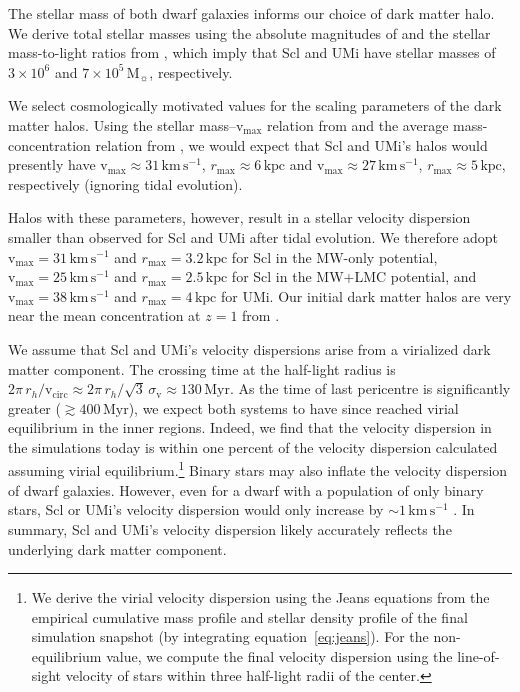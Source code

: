\documentclass[linenumbers, twocolumn, twocolappendix]{aastex701}
\newcommand{\V}{\textrm{v}}
\newcommand{\vmax}{\V_\text{max}}
\newcommand{\rmax}{r_\text{max}}
\newcommand{\kpc}{\text{kpc}}
\newcommand{\kms}{\mathrm{km\,s^{-1}}}
\newcommand{\Mo}{\mathrm{M}_\sun}
\begin{document}
The stellar mass of both dwarf galaxies informs our choice of dark matter halo. We derive total stellar masses using the absolute magnitudes of \citet{munoz+2018} and the stellar mass-to-light ratios from \citet{woo+courteau+dekel2008}, which imply that Scl and UMi have stellar masses of $3\times10^6$ and $7\times10^5\,\Mo$, respectively.

We select cosmologically motivated values for the scaling parameters of the dark matter halos. 
Using the stellar mass--$\vmax$ relation from \citet{fattahi+2018} and the average mass-concentration relation from \citet{ludlow+2016}, we would expect that Scl and UMi's halos would presently have $\vmax \approx 31 \,\kms$, $\rmax\approx6\,\kpc$ and $\vmax \approx 27\,\kms$, $\rmax\approx5\,\kpc$, respectively (ignoring tidal evolution). 

Halos with these parameters, however, result in a stellar velocity dispersion smaller than observed for Scl and UMi after tidal evolution. We therefore adopt  $\vmax = 31\,\kms$ and $\rmax=3.2\,\kpc$ for Scl in the MW-only potential, $\vmax=25\,\kms$ and $\rmax=2.5\,\kpc$ for Scl in the MW+LMC potential, and
$\vmax=38\,\kms$ and $\rmax=4\,\kpc$ for UMi. 
Our initial dark matter halos are very near the mean concentration at $z=1$ from \citet{ludlow+2016}.

We assume that Scl and UMi's velocity dispersions arise from a virialized dark matter component. The crossing time at the half-light radius is $2\pi\, r_h / \mathrm{v}_\textrm{circ} \approx 2\pi\, r_h / \sqrt{3}\,\sigma_\V \approx 130\,\text{Myr}$. As the time of last pericentre is significantly greater ($\gtrsim400\,\text{Myr}$), we expect both systems to have since reached virial equilibrium in the inner regions.
Indeed, we find that the velocity dispersion in the simulations today is within one percent of the velocity dispersion calculated assuming virial equilibrium.\footnote{
    We derive the virial velocity dispersion using the Jeans equations from the
    empirical cumulative mass profile and stellar density profile of the final
    simulation snapshot (by integrating equation~\ref{eq:jeans}). For the
    non-equilibrium value, we compute the final velocity dispersion using the
    line-of-sight velocity of stars within three half-light radii of the
    center.
}
Binary stars may also inflate the velocity dispersion of dwarf galaxies. However, even for a dwarf with a population of only binary stars, Scl or UMi's velocity dispersion would only increase by ${\sim} 1\,\kms$  \citep[e.g.,][]{spencer+2017}. In summary, Scl and UMi's velocity dispersion likely accurately reflects the underlying dark matter component.
\end{document}
